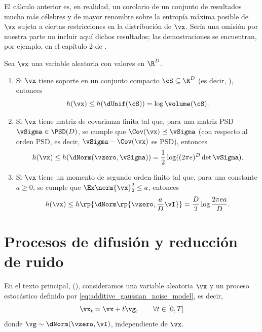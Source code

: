 \documentclass[../../book-main_es.tex]{subfiles}
\begin{document}
El cálculo anterior es, en realidad, un corolario de un conjunto de resultados mucho más célebres
y de mayor renombre sobre la entropía máxima posible de
\(\vx\) sujeta a ciertas restricciones en la distribución de
\(\vx\). Sería una omisión por nuestra parte no incluir aquí dichos resultados; las
demostraciones se encuentran, por ejemplo, en el capítulo 2 de \cite{poliyanski2024information}.
\begin{theorem}\label{thm:max_entropy}
    Sea \(\vx\) una variable aleatoria con valores en \(\R^{D}\).
    \begin{enumerate}
        \item Si \(\vx\) tiene soporte en un conjunto compacto \(\cS
            \subseteq \R^{D}\) (es decir,
            ), entonces
            \begin{equation}
                h(\vx) \leq h(\dUnif(\cS)) = \log \volume(\cS).
            \end{equation}
        \item Si \(\vx\) tiene matriz de covarianza finita tal que, para una matriz PSD
            \(\vSigma \in \PSD(D)\), se cumple que \(\Cov(\vx)
            \preceq \vSigma\) (con respecto al orden PSD, es decir,
            \(\vSigma - \Cov(\vx)\) es PSD), entonces
            \begin{equation}
                h(\vx) \leq h(\dNorm(\vzero, \vSigma)) =
                \frac{1}{2}\log((2\pi e)^{D}\det\vSigma).
            \end{equation}
        \item Si \(\vx\) tiene un momento de segundo orden finito tal que, para una
            constante \(a \geq 0\), se cumple que \(\Ex\norm{\vx}_{2}^{2}
            \leq a\), entonces
            \begin{equation}
                h(\vx) \leq h\rp{\dNorm\rp{\vzero, \frac{a}{D}\vI}} =
                \frac{D}{2}\log\frac{2\pi e a}{D}.
            \end{equation}
    \end{enumerate}
\end{theorem}

\section{Procesos de difusión y reducción de ruido}\label{sec:entropy_diffusion}

En el texto principal, (), consideramos una variable aleatoria
\(\vx\) y un proceso estocástico definido por
\eqref{eq:additive_gaussian_noise_model}, es decir,
\begin{equation}\label{eq:app_additive_gaussian_noise_model}
    \vx_{t} = \vx + t\vg, \qquad  \forall t \in [0, T]
\end{equation}
donde \(\vg \sim \dNorm(\vzero, \vI)\), independiente de \(\vx\).
\end{document}
